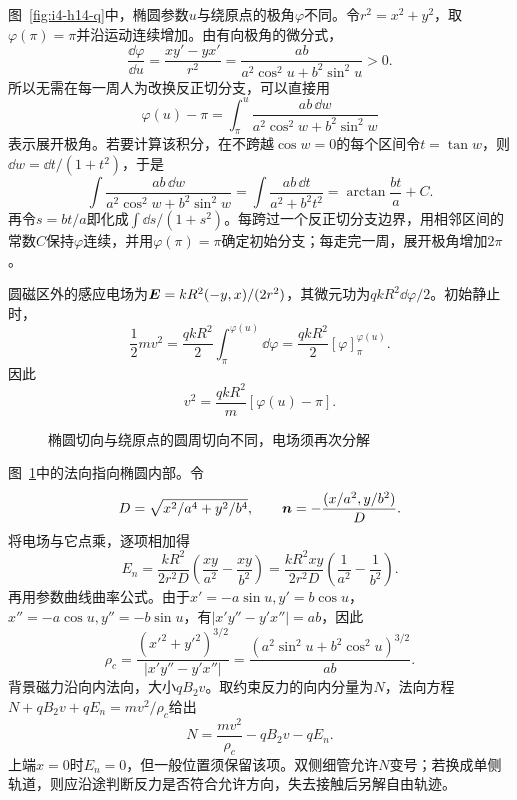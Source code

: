 \begin{solution}
\begingroup
\setlength{\abovedisplayskip}{3pt}\setlength{\belowdisplayskip}{3pt}
图~\ref{fig:i4-h14-q}中，椭圆参数$u$与绕原点的极角$\varphi$不同。令$r^2=x^2+y^2$，取$\varphi(\pi)=\pi$并沿运动连续增加。由有向极角的微分式，
\[
\frac{\dd\varphi}{\dd u}
=\frac{xy'-yx'}{r^2}
=\frac{ab}{a^2\cos^2u+b^2\sin^2u}>0.
\]
所以无需在每一周人为改换反正切分支，可以直接用
\[
\varphi(u)-\pi=\int_\pi^u
\frac{ab\,\dd w}{a^2\cos^2w+b^2\sin^2w}
\]
表示展开极角。若要计算该积分，在不跨越$\cos w=0$的每个区间令$t=\tan w$，则$\dd w=\dd t/(1+t^2)$，于是
\[\int\frac{ab\,\dd w}{a^2\cos^2w+b^2\sin^2w}
=\int\frac{ab\,\dd t}{a^2+b^2t^2}
=\arctan\frac{bt}{a}+C.\]
再令$s=bt/a$即化成$\int\dd s/(1+s^2)$。每跨过一个反正切分支边界，用相邻区间的常数$C$保持$\varphi$连续，并用$\varphi(\pi)=\pi$确定初始分支；每走完一周，展开极角增加$2\pi$。

圆磁区外的感应电场为$\bm{E}=kR^2(-y,x)/(2r^2)$，其微元功为$qkR^2\dd\varphi/2$。初始静止时，
\[\frac12mv^2=\frac{qkR^2}{2}\int_\pi^{\varphi(u)}\dd\varphi
=\frac{qkR^2}{2}[\varphi]_\pi^{\varphi(u)}.\]
因此
\[
\boxed{v^2=\frac{qkR^2}{m}[\varphi(u)-\pi]}.
\]
\begin{figure}[H]\centering
{}
\caption{椭圆切向与绕原点的圆周切向不同，电场须再次分解}\label{fig:i4-h14-s}
\end{figure}
图~\ref{fig:i4-h14-s}中的法向指向椭圆内部。令
\[
D=\sqrt{x^2/a^4+y^2/b^4},\qquad
\bm{n}=-\frac{(x/a^2,y/b^2)}D.
\]
将电场与它点乘，逐项相加得
\[
E_n=\frac{kR^2}{2r^2D}
\left(\frac{xy}{a^2}-\frac{xy}{b^2}\right)
=\frac{kR^2xy}{2r^2D}
\left(\frac1{a^2}-\frac1{b^2}\right).
\]
再用参数曲线曲率公式。由于$x'=-a\sin u,y'=b\cos u$，$x''=-a\cos u,y''=-b\sin u$，有$|x'y''-y'x''|=ab$，因此
\[
\rho_c=\frac{(x'^2+y'^2)^{3/2}}{|x'y''-y'x''|}
=\frac{(a^2\sin^2u+b^2\cos^2u)^{3/2}}{ab}.
\]
背景磁力沿向内法向，大小$qB_2v$。取约束反力的向内分量为$N$，法向方程$N+qB_2v+qE_n=mv^2/\rho_c$给出
\[
\boxed{N=\frac{mv^2}{\rho_c}-qB_2v-qE_n}.
\]
上端$x=0$时$E_n=0$，但一般位置须保留该项。双侧细管允许$N$变号；若换成单侧轨道，则应沿途判断反力是否符合允许方向，失去接触后另解自由轨迹。
\par\endgroup
\end{solution}
